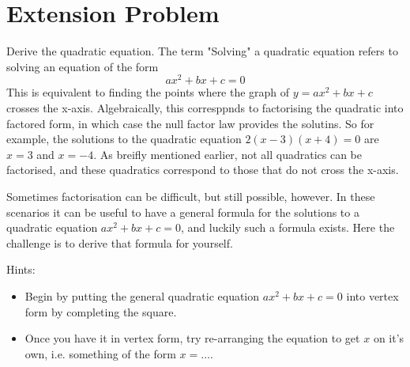 \documentclass[12pt]{article}
\begin{document}
\pagebreak
\section*{Extension Problem}

Derive the quadratic equation. The term "Solving" a quadratic equation refers to solving an equation of the form
\begin{equation*}
ax^2 + bx + c = 0
\end{equation*}
This is equivalent to finding the points where the graph of $y = ax^2 + bx + c$ crosses the x-axis. Algebraically, this corresppnds to factorising the quadratic into factored form, in which case the null factor law provides the solutins. So for example, the solutions to the quadratic equation $2(x-3)(x+4) = 0$ are $x = 3$ and $x = -4$. As breifly mentioned earlier, not all quadratics can be factorised, and these quadratics correspond to those that do not cross the x-axis.

Sometimes factorisation can be difficult, but still possible, however. In these scenarios it can be useful to have a general formula for the solutions to a quadratic equation $ax^2 + bx + c = 0$, and luckily such a formula exists. Here the challenge is to derive that formula for yourself.

Hints:
\begin{itemize}
\item Begin by putting the general quadratic equation $ax^2 + bx + c = 0$ into vertex form by completing the square.
\item Once you have it in vertex form, try re-arranging the equation to get $x$ on it's own, i.e. something of the form $x = \hdots$.
\end{itemize}
\end{document}
